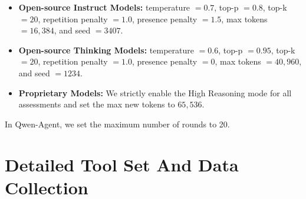 \documentclass[runningheads]{llncs}
\begin{document}
\begin{itemize}
    \item \textbf{Open-source Instruct Models:} temperature $= 0.7$, top-p $= 0.8$, top-k $= 20$, repetition penalty $= 1.0$, presence penalty $= 1.5$, max tokens $= 16{,}384$, and seed $= 3407$.
    
    \item \textbf{Open-source Thinking Models:} temperature $= 0.6$, top-p $= 0.95$, top-k $= 20$, repetition penalty $= 1.0$, presence penalty $= 0$, max tokens $= 40{,}960$, and seed $= 1234$.
    
    \item \textbf{Proprietary Models:} We strictly enable the High Reasoning mode for all assessments and set the max new tokens to $65{,}536$.
\end{itemize}

In Qwen-Agent, we set the maximum number of rounds to 20.

\section{Detailed Tool Set And Data Collection}
\end{document}
